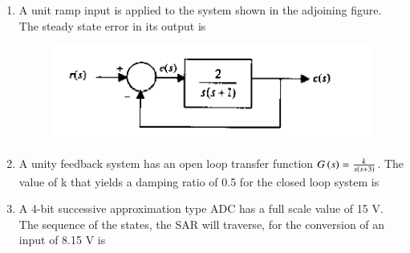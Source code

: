 \documentclass[journal,12pt,onecolumn]{IEEEtran}
\theoremstyle{remark}
\begin{document}
\begin{enumerate}
\item A unit ramp input is applied to the system shown in the adjoining figure. The steady state error in its output is
\begin{figure}[H]
    \centering
    \includegraphics[width = 0.7\columnwidth]{q39}
    \caption*{}
    \label{fig:Q39}
\end{figure}

\hfill{}\begin{enumerate}  \end{enumerate}



\item A unity feedback system has an open loop transfer function $G\left(s\right) = \frac{k}{s\left(s+3\right)}$. The value of k that yields a damping ratio of 0.5 for the closed loop system is

\hfill{}\begin{enumerate}  \end{enumerate}

\item A 4-bit successive approximation type ADC has a full scale value of 15 V. The sequence of the states, the SAR will traverse, for the conversion of an input of 8.15 V is


\end{enumerate}
\end{document}
